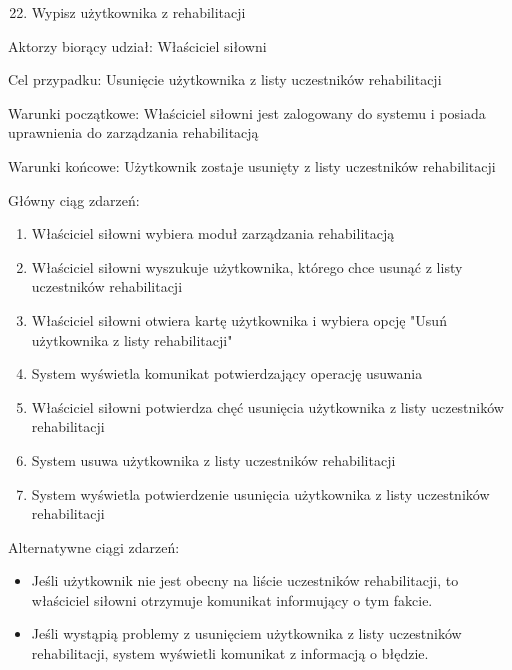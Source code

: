 \documentclass[
]{article}
\providecommand{\tightlist}{%
  \setlength{\itemsep}{0pt}\setlength{\parskip}{0pt}}
\begin{document}
{}

{}

{}

\begin{enumerate}
\setcounter{enumi}{21}
\tightlist
\item
  {Wypisz użytkownika z rehabilitacji}
\end{enumerate}

{Aktorzy biorący udział: Właściciel siłowni}

{Cel przypadku: Usunięcie użytkownika z listy uczestników rehabilitacji}

{Warunki początkowe: Właściciel siłowni jest zalogowany do systemu i
posiada uprawnienia do zarządzania rehabilitacją}

{Warunki końcowe: Użytkownik zostaje usunięty z listy uczestników
rehabilitacji}

{Główny ciąg zdarzeń:}

\begin{enumerate}
\tightlist
\item
  {Właściciel siłowni wybiera moduł zarządzania rehabilitacją}
\item
  {Właściciel siłowni wyszukuje użytkownika, którego chce usunąć z listy
  uczestników rehabilitacji}
\item
  {Właściciel siłowni otwiera kartę użytkownika i wybiera opcję "Usuń
  użytkownika z listy rehabilitacji"}
\item
  {System wyświetla komunikat potwierdzający operację usuwania}
\item
  {Właściciel siłowni potwierdza chęć usunięcia użytkownika z listy
  uczestników rehabilitacji}
\item
  {System usuwa użytkownika z listy uczestników rehabilitacji}
\item
  {System wyświetla potwierdzenie usunięcia użytkownika z listy
  uczestników rehabilitacji}
\end{enumerate}

{Alternatywne ciągi zdarzeń:}

\begin{itemize}
\tightlist
\item
  {Jeśli użytkownik nie jest obecny na liście uczestników rehabilitacji,
  to właściciel siłowni otrzymuje komunikat informujący o tym fakcie.}
\item
  {Jeśli wystąpią problemy z usunięciem użytkownika z listy uczestników
  rehabilitacji, system wyświetli komunikat z informacją o błędzie.}
\end{itemize}
\end{document}
